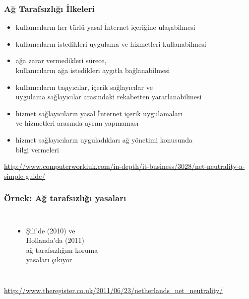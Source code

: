 \documentclass[dvipsnames]{beamer}
\theoremstyle{definition}
\theoremstyle{example}
\theoremstyle{plain}
\begin{document}
\begin{frame}
  \frametitle{Ağ Tarafsızlığı İlkeleri}

  \begin{itemize}
    \item kullanıcıların her türlü yasal İnternet içeriğine ulaşabilmesi
    \item kullanıcıların istedikleri uygulama ve hizmetleri kullanabilmesi
    \item ağa zarar vermedikleri sürece,\\
      kullanıcıların ağa istedikleri aygıtla bağlanabilmesi
    \item kullanıcıların taşıyıcılar, içerik sağlayıcılar ve\\
      uygulama sağlayıcılar arasındaki rekabetten yararlanabilmesi

    \pause
    \medskip
    \item hizmet sağlayıcıların yasal İnternet içerik uygulamaları\\
      ve hizmetleri arasında ayrım yapmaması
    \item hizmet sağlayıcıların uyguladıkları ağ yönetimi konusunda\\
      bilgi vermeleri
  \end{itemize}

  \medskip
  \tiny{\url{http://www.computerworlduk.com/in-depth/it-business/3028/net-neutrality-a-simple-guide/}}\\
\end{frame}

\begin{frame}
  \frametitle{Örnek: Ağ tarafsızlığı yasaları}

  \begin{columns}
    \begin{center}
    \end{center}

    \begin{itemize}
      \item Şili'de (2010) ve\\
        Hollanda'da (2011)\\
        ağ tarafsızlığını koruma\\
        yasaları çıkıyor
    \end{itemize}
  \end{columns}

  \medskip
  \tiny{\url{http://www.theregister.co.uk/2011/06/23/netherlands_net_neutrality/}}\\
\end{frame}
\end{document}
